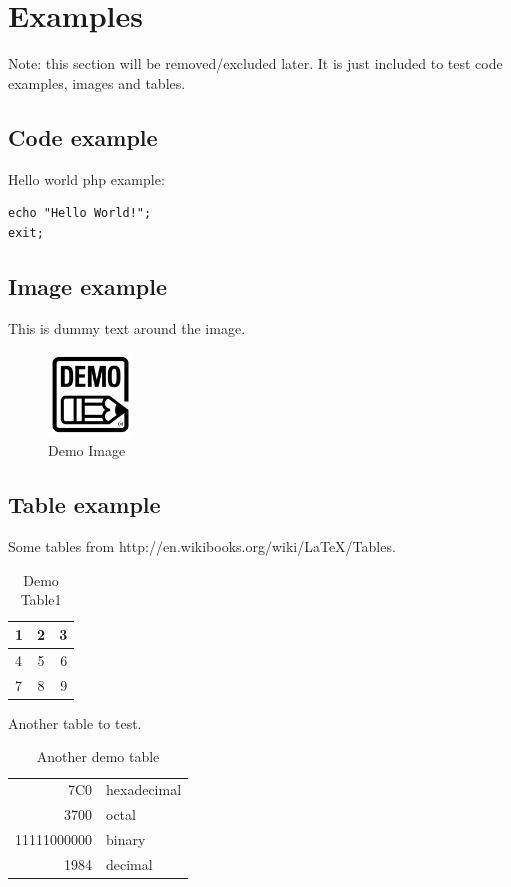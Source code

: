 \documentclass[main.tex]{subfiles}
\begin{document}
    \section{Examples}\label{sec:examples}
    Note: this section will be removed/excluded later. 
    It is just included to test code examples, images and tables.
    
    \subsection{Code example}
    Hello world php example:
    \begin{lstlisting}
echo "Hello World!";
exit;
\end{lstlisting}
    
    

    
    \subsection{Image example}
    
    This is dummy text around the image.
    \begin{figure}[H]
        \includegraphics[width=0.2\textwidth]{img/demo.jpg}
        \caption{Demo Image}
        \label{fig:demo_image}
    \end{figure}

    
    \subsection{Table example}
    Some tables from http://en.wikibooks.org/wiki/LaTeX/Tables.

\begin{table}[H]
    \begin{tabular}{ | l | c | r | }
        \hline
        1 & 2 & 3 \\
        \hline
        4 & 5 & 6 \\    
        \hline
        7 & 8 & 9 \\
        \hline
    \end{tabular}
  \caption{Demo Table1}
  \label{tab:demo_table1}
\end{table}

Another table to test.

\begin{table}[H]
    \begin{tabular}{|r|l|}
      \hline
      7C0 & hexadecimal \\
      3700 & octal \\ \cline{2-2}
      11111000000 & binary \\
      \hline \hline
      1984 & decimal \\
      \hline
    \end{tabular}
    \caption{Another demo table}
    \label{tab:demo_table2}
\end{table}
\end{document}
